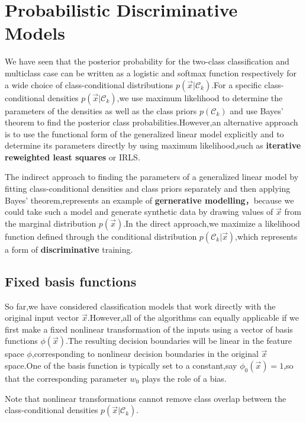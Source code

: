 \section{Probabilistic Discriminative Models}
We have seen that the posterior probability for the two-class classification and multiclass case can be written as a logistic and softmax function respectively for a wide choice of class-conditional distributions $p(\vec{x}|\mathcal{C}_k)$.For a specific class-conditional densities $p(\vec{x}|\mathcal{C}_k)$,we use maximum likelihood to determine the parameters of the densities as well as the
class priors $p(\mathcal{C}_k)$ and use Bayes' theorem to find the posterior class probabilities.However,an alternative approach is to use the functional form of the generalized linear model explicitly and to determine its parameters directly by using maximum likelihood,such as \textbf{iterative reweighted least squares} or IRLS.

The indirect approach to finding the parameters of a generalized linear model by fitting class-conditional densities  and class priors separately and then applying Bayes' theorem,represents an example of \textbf{gernerative modelling}，because we could take such a model and generate synthetic data by drawing values of $\vec{x}$ from the marginal distribution $p(\vec{x})$.In the direct approach,we maximize a likelihood function defined through the conditional distribution $p(\mathcal{C}_k|\vec{x})$,which represents a form of \textbf{discriminative} training.

 


\subsection{Fixed basis functions}
So far,we have considered classification models that work directly with the original input vector $\vec{x}$.However,all of the algorithms can equally applicable if we first make a fixed  nonlinear transformation of the inputs using a vector of basis functions $\phi(\vec{x})$.The resulting decision boundaries will be linear in the feature space $\phi$,corresponding to nonlinear decision boundaries in the original $\vec{x}$ space.One of the basis function is typically set to a constant,say $\phi_0(\vec{x})=1$,so that the corresponding parameter $w_0$ plays the role of a bias.

Note that nonlinear transformations cannot remove class overlap between the class-conditional densities $p(\vec{x}|\mathcal{C}_k)$.

